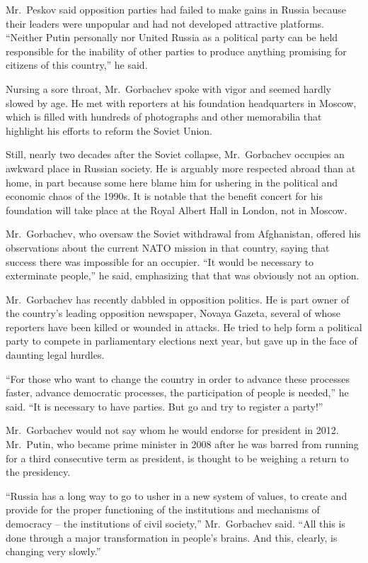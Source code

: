﻿\documentclass[12pt]{article}
\begin{document}
Mr.~Peskov said opposition parties had failed to make gains in Russia because their leaders were
unpopular and had not developed attractive platforms. ``Neither Putin personally nor United Russia
as a political party can be held responsible for the inability of other parties to produce anything
promising for citizens of this country,'' he said.

Nursing a sore throat, Mr.~Gorbachev spoke with vigor and seemed hardly slowed by age. He met with
reporters at his foundation headquarters in Moscow, which is filled with hundreds of photographs and
other memorabilia that highlight his efforts to reform the Soviet Union.

Still, nearly two decades after the Soviet collapse, Mr.~Gorbachev occupies an awkward place in
Russian society. He is arguably more respected abroad than at home, in part because some here blame
him for ushering in the political and economic chaos of the 1990s. It is notable that the benefit
concert for his foundation will take place at the Royal Albert Hall in London, not in Moscow.

Mr.~Gorbachev, who oversaw the Soviet withdrawal from Afghanistan, offered his observations about
the current NATO mission in that country, saying that success there was impossible for an occupier.
``It would be necessary to exterminate people,'' he said, emphasizing that that was obviously not an
option.

Mr.~Gorbachev has recently dabbled in opposition politics. He is part owner of the country's leading
opposition newspaper, Novaya Gazeta, several of whose reporters have been killed or wounded in
attacks. He tried to help form a political party to compete in parliamentary elections next year,
but gave up in the face of daunting legal hurdles.

``For those who want to change the country in order to advance these processes faster, advance
democratic processes, the participation of people is needed,'' he said. ``It is necessary to have
parties. But go and try to register a party!''

Mr.~Gorbachev would not say whom he would endorse for president in 2012. Mr.~Putin, who became prime
minister in 2008 after he was barred from running for a third consecutive term as president, is
thought to be weighing a return to the presidency.

``Russia has a long way to go to usher in a new system of values, to create and provide for the
proper functioning of the institutions and mechanisms of democracy -- the institutions of civil
society,'' Mr.~Gorbachev said. ``All this is done through a major transformation in people's brains.
And this, clearly, is changing very slowly.''
\end{document}
